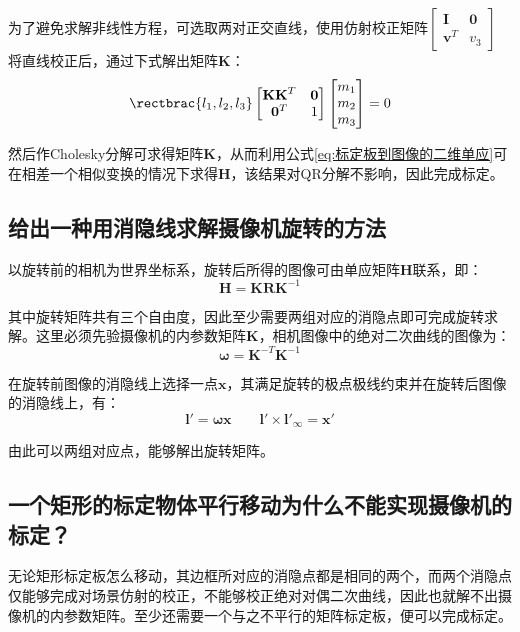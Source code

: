 \documentclass[11pt]{article}
\begin{document}
为了避免求解非线性方程，可选取两对正交直线，使用仿射校正矩阵$\begin{bmatrix}
    \mathbf{I}   & \mathbf{0} \\
    \mathbf{v}^T & v_3
  \end{bmatrix}$
将直线校正后，通过下式解出矩阵$\mathbf{K}$：
\begin{equation*}
  \rectbrac{l_1,l_2,l_3}\begin{bmatrix}
    \mathbf{KK}^T & \mathbf{0} \\
    \mathbf{0}^T  & 1
  \end{bmatrix}\begin{bmatrix}
    m_1 \\
    m_2 \\
    m_3
  \end{bmatrix}=0
\end{equation*}\par
然后作Cholesky分解可求得矩阵$\mathbf{K}$，从而利用公式\ref{eq:标定板到图像的二维单应}可在相差一个相似变换的情况下求得$\mathbf{H}$，该结果对QR分解不影响，因此完成标定。
\subsection{给出一种用消隐线求解摄像机旋转的方法}
以旋转前的相机为世界坐标系，旋转后所得的图像可由单应矩阵$\mathbf{H}$联系，即：
\begin{equation*}
  \mathbf{H}=\mathbf{KRK}^{-1}
\end{equation*}\par
其中旋转矩阵共有三个自由度，因此至少需要两组对应的消隐点即可完成旋转求解。这里必须先验摄像机的内参数矩阵$\mathbf{K}$，相机图像中的绝对二次曲线的图像为：
\begin{equation*}
  \mathbold{\omega}=\mathbf{K}^{-T}\mathbf{K}^{-1}
\end{equation*}\par
在旋转前图像的消隐线上选择一点$\mathbf{x}$，其满足旋转的极点极线约束并在旋转后图像的消隐线上，有：
\begin{equation*}
  \mathbf{l}'=\mathbold{\omega x}\qquad\mathbf{l}'\times\mathbf{l'}_\infty=\mathbf{x'}
\end{equation*}\par
由此可以两组对应点，能够解出旋转矩阵。
\subsection{一个矩形的标定物体平行移动为什么不能实现摄像机的标定？}
无论矩形标定板怎么移动，其边框所对应的消隐点都是相同的两个，而两个消隐点仅能够完成对场景仿射的校正，不能够校正绝对对偶二次曲线，因此也就解不出摄像机的内参数矩阵。至少还需要一个与之不平行的矩阵标定板，便可以完成标定。
\end{document}
